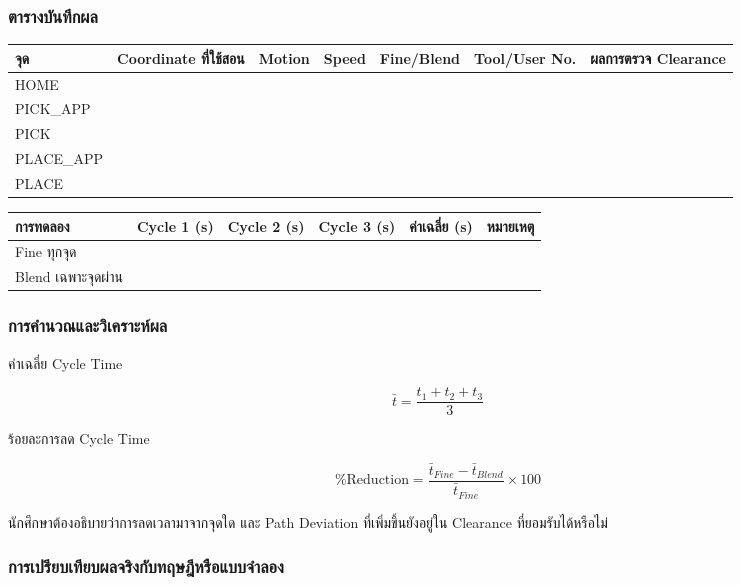 \subsubsection{ตารางบันทึกผล}

\begin{table}[htbp]
    \centering
    \begin{tabular}{l l l r l l l}
        \hline
        \textbf{จุด} & \textbf{Coordinate ที่ใช้สอน} & \textbf{Motion} & \textbf{Speed} & \textbf{Fine/Blend} & \textbf{Tool/User No.} & \textbf{ผลการตรวจ Clearance} \\
        \hline
        HOME &  &  &  &  &  &  \\
        PICK\_APP &  &  &  &  &  &  \\
        PICK &  &  &  &  &  &  \\
        PLACE\_APP &  &  &  &  &  &  \\
        PLACE &  &  &  &  &  &  \\
        \hline
    \end{tabular}
\end{table}

\begin{table}[htbp]
    \centering
    \begin{tabular}{l r r r r l}
        \hline
        \textbf{การทดลอง} & \textbf{Cycle 1 (s)} & \textbf{Cycle 2 (s)} & \textbf{Cycle 3 (s)} & \textbf{ค่าเฉลี่ย (s)} & \textbf{หมายเหตุ} \\
        \hline
        Fine ทุกจุด &  &  &  &  &  \\
        Blend เฉพาะจุดผ่าน &  &  &  &  &  \\
        \hline
    \end{tabular}
\end{table}

\subsubsection{การคำนวณและวิเคราะห์ผล}

ค่าเฉลี่ย Cycle Time

\[
\bar{t}=\frac{t_1+t_2+t_3}{3}
\]

ร้อยละการลด Cycle Time

\[
\%\text{Reduction}=\frac{\bar{t}_{Fine}-\bar{t}_{Blend}}{\bar{t}_{Fine}}\times100
\]

นักศึกษาต้องอธิบายว่าการลดเวลามาจากจุดใด และ Path Deviation ที่เพิ่มขึ้นยังอยู่ใน Clearance ที่ยอมรับได้หรือไม่

\subsubsection{การเปรียบเทียบผลจริงกับทฤษฎีหรือแบบจำลอง}

